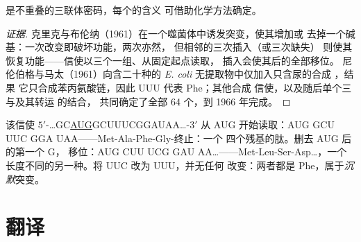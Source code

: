\begin{proposition}[遗传密码的破译]\label{prop:b1:gene-expression:nirenberg}
是不重叠的三联体密码，每个的含义
可借助化学方法确定。
\end{proposition}
\begin{proof}[证据]
克里克与布伦纳（1961）在一个噬菌体中诱发突变，使其增加或
去掉一个碱基：一次改变即破坏功能，两次亦然，
但相邻的三次插入（或三次缺失）
则使其恢复功能——信使以三个一组、从固定起点读取，
插入会使其后的全部移位。
尼伦伯格与马太（1961）向含二十种的
\emph{E. coli} 无提取物中仅加入只含尿的合成 ，结果
它只合成苯丙氨酸链，因此 UUU 代表 Phe；其他合成
信使，以及随后单个三与及其转运  的结合，
共同确定了全部 64 个，到 1966 年完成。
\end{proof}

\begin{example}[读取一条信使]\label{ex:b1:gene-expression:reading}
该信使 $5'$-\ldots{}GC\underline{AUG}GCUUUCGGAUAA\ldots{}-$3'$
从 AUG 开始读取：AUG GCU UUC GGA UAA——Met-Ala-Phe-Gly-终止：一个
四个残基的肽。删去 AUG 后的第一个 G，
移位：AUG CUU UCG GAU AA\ldots{}——Met-Leu-Ser-Asp\ldots，一个
长度不同的另一种。将 UUC 改为 UUU，并无任何
改变：两者都是 Phe，属于\emph{沉默}突变。
\end{example}

\section{翻译}

